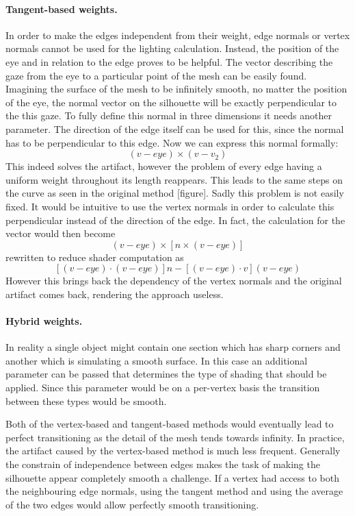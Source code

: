 \documentclass[a4paper, 12pt]{article}
\begin{document}
\paragraph{Tangent-based weights.}
In order to make the edges independent from their weight, edge normals or vertex normals cannot be used for the lighting calculation. Instead, the position of the eye and in relation to the edge proves to be helpful. The vector describing the gaze from the eye to a particular point of the mesh can be easily found. Imagining the surface of the mesh to be infinitely smooth, no matter the position of the eye, the normal vector on the silhouette will be exactly perpendicular to the this gaze. To fully define this normal in three dimensions it needs another parameter. The direction of the edge itself can be used for this, since the normal has to be perpendicular to this edge. Now we can express this normal formally:
$$(v-eye) \times (v-v_2)$$
This indeed solves the artifact, however the problem of every edge having a uniform weight throughout its length reappears.  This leads to the same steps on the curve as seen in the original method [figure]. Sadly this problem is not easily fixed. It would be intuitive to use the vertex normals in order to calculate this perpendicular instead of the direction of the edge. In fact, the calculation for the vector would then become
$$(v-eye) \times [n \times (v-eye)]$$
rewritten to reduce shader computation as
$$[(v-eye) \cdot (v-eye)]n - [(v-eye) \cdot v](v-eye)$$
However this brings back the dependency of the vertex normals and the original artifact comes back, rendering the approach useless.

\paragraph{Hybrid weights.}
In reality a single object might contain one section which has sharp corners and another which is simulating a smooth surface. In this case an additional parameter can be passed that determines the type of shading that should be applied. Since this parameter would be on a per-vertex basis the transition between these types would be smooth.

Both of the vertex-based and tangent-based methods would eventually lead to perfect transitioning as the detail of the mesh tends towards infinity. In practice, the artifact caused by the vertex-based method is much less frequent. Generally the constrain of independence between edges makes the task of making the silhouette appear completely smooth a challenge. If a vertex had access to both the neighbouring edge normals, using the tangent method and using the average of the two edges would allow perfectly smooth transitioning.
\end{document}
